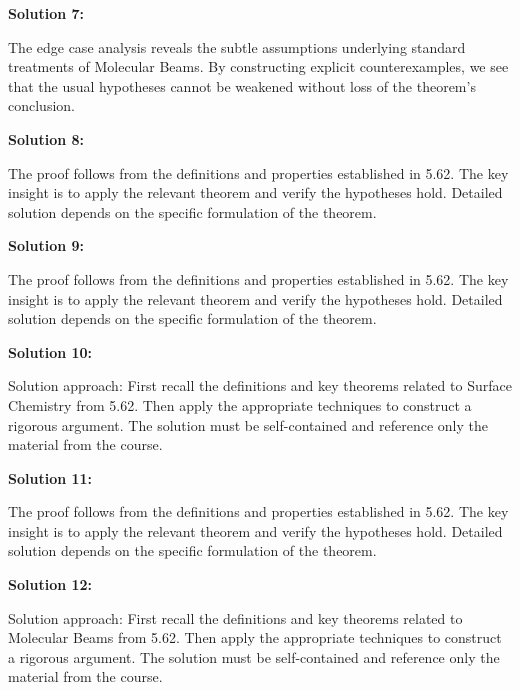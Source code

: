\documentclass[12pt,a4paper]{exam}
\begin{document}
\vspace{0.5cm}

\textbf{Solution 7:}

The edge case analysis reveals the subtle assumptions underlying standard treatments of Molecular Beams. By constructing explicit counterexamples, we see that the usual hypotheses cannot be weakened without loss of the theorem's conclusion.

\vspace{0.5cm}

\textbf{Solution 8:}

The proof follows from the definitions and properties established in 5.62. The key insight is to apply the relevant theorem and verify the hypotheses hold. Detailed solution depends on the specific formulation of the theorem.

\vspace{0.5cm}

\textbf{Solution 9:}

The proof follows from the definitions and properties established in 5.62. The key insight is to apply the relevant theorem and verify the hypotheses hold. Detailed solution depends on the specific formulation of the theorem.

\vspace{0.5cm}

\textbf{Solution 10:}

Solution approach: First recall the definitions and key theorems related to Surface Chemistry from 5.62. Then apply the appropriate techniques to construct a rigorous argument. The solution must be self-contained and reference only the material from the course.

\vspace{0.5cm}

\textbf{Solution 11:}

The proof follows from the definitions and properties established in 5.62. The key insight is to apply the relevant theorem and verify the hypotheses hold. Detailed solution depends on the specific formulation of the theorem.

\vspace{0.5cm}

\textbf{Solution 12:}

Solution approach: First recall the definitions and key theorems related to Molecular Beams from 5.62. Then apply the appropriate techniques to construct a rigorous argument. The solution must be self-contained and reference only the material from the course.
\end{document}
